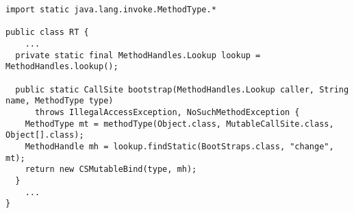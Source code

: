 {\tiny \begin{verbatim}
import static java.lang.invoke.MethodType.*

public class RT {
    ...
  private static final MethodHandles.Lookup lookup = MethodHandles.lookup();

  public static CallSite bootstrap(MethodHandles.Lookup caller, String name, MethodType type)
      throws IllegalAccessException, NoSuchMethodException {
    MethodType mt = methodType(Object.class, MutableCallSite.class, Object[].class);
    MethodHandle mh = lookup.findStatic(BootStraps.class, "change", mt);
    return new CSMutableBind(type, mh);
  }
    ...
}
\end{verbatim} }